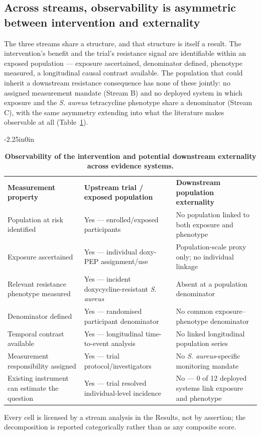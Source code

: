 \documentclass[10pt,letterpaper]{article}
\newlength\savedwidth
\newcommand\thickhline{\noalign{\global\savedwidth\arrayrulewidth\global\arrayrulewidth 2pt}%
\hline
\noalign{\global\arrayrulewidth\savedwidth}}
\begin{document}
\subsection*{Across streams, observability is asymmetric between intervention and externality}

The three streams share a structure, and that structure is itself a
result. The intervention's benefit and the trial's resistance signal are
identifiable within an exposed population --- exposure ascertained,
denominator defined, phenotype measured, a longitudinal causal contrast
available. The population that could inherit a downstream resistance
consequence has none of these jointly: no assigned measurement mandate
(Stream B) and no deployed system in which exposure and the \emph{S.
aureus} tetracycline phenotype share a denominator (Stream C), with the
same asymmetry extending into what the literature makes observable at all (Table~\ref{table1}).

\begin{table}[!ht]
\begin{adjustwidth}{-2.25in}{0in}
\centering
\caption{{\bf Observability of the intervention and potential downstream externality across evidence systems.}}
\label{table1}
\begin{tabular}{|p{1.6in}|p{2.5in}|p{2.7in}|}
\hline
\textbf{Measurement property} & \textbf{Upstream trial / exposed population} & \textbf{Downstream population externality} \\ \thickhline
Population at risk identified & Yes --- enrolled/exposed participants & No population linked to both exposure and phenotype \\ \hline
Exposure ascertained & Yes --- individual doxy-PEP assignment/use & Population-scale proxy only; no individual linkage \\ \hline
Relevant resistance phenotype measured & Yes --- incident doxycycline-resistant \emph{S. aureus} & Absent at a population denominator \\ \hline
Denominator defined & Yes --- randomised participant denominator & No common exposure--phenotype denominator \\ \hline
Temporal contrast available & Yes --- longitudinal time-to-event analysis & No linked longitudinal population series \\ \hline
Measurement responsibility assigned & Yes --- trial protocol/investigators & No \emph{S. aureus}-specific monitoring mandate \\ \hline
Existing instrument can estimate the question & Yes --- trial resolved individual-level incidence & No --- 0 of 12 deployed systems link exposure and phenotype \\ \hline
\end{tabular}
\begin{flushleft} Every cell is licensed by a stream analysis in the Results, not by assertion; the decomposition is reported categorically rather than as any composite score.
\end{flushleft}
\end{adjustwidth}
\end{table}
\end{document}
